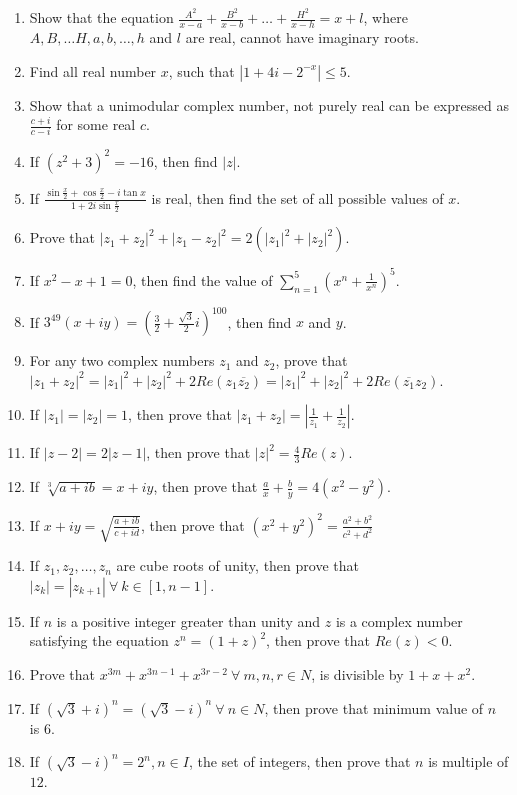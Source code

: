 \begin{enumerate}[resume]
\item Show that the equation $\frac{A^2}{x - a} + \frac{B^2}{x - b} + \ldots + \frac{H^2}{x - h} = x + l$, where $A, B, \ldots H,
  a, b, \ldots, h$ and $l$ are real, cannot have imaginary roots.
\item Find all real number $x$, such that $|1 + 4i - 2^{-x}|\leq 5$.
\item Show that a unimodular complex number, not purely real can be expressed as $\frac{c + i}{c - i}$ for some real $c$.
\item If $(z^2 + 3)^2 = -16$, then find $|z|$.
\item If $\frac{\sin\frac{x}{2} + \cos\frac{x}{2} - i\tan x}{1 + 2i\sin\frac{x}{2}}$ is real, then find the set of all possible
  values of $x$.
\item Prove that $|z_1 + z_2|^2 + |z_1 - z_2|^2 = 2(|z_1|^2 + |z_2|^2)$.
\item If $x^2 - x + 1 = 0$, then find the value of $\sum_{n = 1}^5\left(x^n + \frac{1}{x^n}\right)^5$.
\item If $3^{49}(x + iy) = \left(\frac{3}{2} + \frac{\sqrt{3}}{2}i\right)^{100}$, then find $x$ and $y$.
\item For any two complex numbers $z_1$ and $z_2$, prove that $|z_1 + z_2|^2 = |z_1|^2 + |z_2|^2 + 2Re(z_1\overline{z_2}) = |z_1|^2
  + |z_2|^2 + 2Re(\overline{z_1}z_2)$.
\item If $|z_1| = |z_2| = 1$, then prove that $|z_1 + z_2| = \left|\frac{1}{z_1} + \frac{1}{z_2}\right|$.
\item If $|z - 2| = 2|z - 1|$, then prove that $|z|^2 = \frac{4}{3}Re(z)$.
\item If $\sqrt[3]{a + ib} = x + iy$, then prove that $\frac{a}{x} + \frac{b}{y} = 4(x^2 - y^2)$.
\item If $x + iy = \sqrt{\frac{a + ib}{c + id}}$, then prove that $(x^2 + y^2)^2 = \frac{a^2 + b^2}{c^2 + d^2}$
\item If $z_1, z_2, \ldots, z_n$ are cube roots of unity, then prove that $|z_k| = |z_{k + 1}|~\forall~k\in[1, n - 1]$.
\item If $n$ is a positive integer greater than unity and $z$ is a complex number satisfying the equation $z^n = (1 + z)^2$, then
  prove that $Re(z) < 0$.
\item Prove that $x^{3m} + x^{3n - 1} + x^{3r - 2}~\forall~m,n,r\in N$, is divisible by $1 + x + x^2$.
\item If $(\sqrt{3} + i)^n = (\sqrt{3} - i)^n~\forall~n\in N$, then prove that minimum value of $n$ is $6$.
\item If $(\sqrt{3} - i)^n = 2^n, n\in I$, the set of integers, then prove that $n$ is multiple of $12$.

\end{enumerate}
